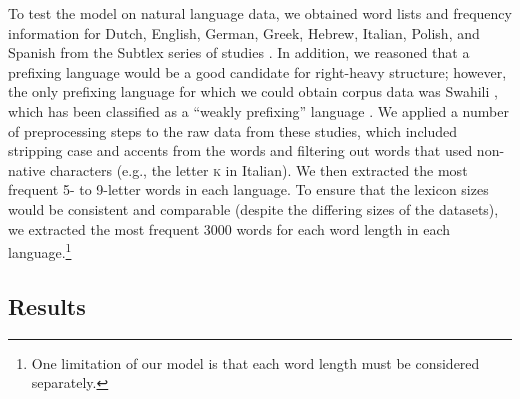 \documentclass[doc,biblatex,floatsintext]{apa7}
\begin{document}
To test the model on natural language data, we obtained word lists and frequency information for Dutch, English, German, Greek, Hebrew, Italian, Polish, and Spanish from the Subtlex series of studies \parencite{Brysbaert:2009, Brysbaert:2011, Crepaldi:2015, Cuetos:2011, Dimitropoulou:2010, Keuleers:2010, Mandera:2014, VanParidon:2021}. In addition, we reasoned that a prefixing language would be a good candidate for right-heavy structure; however, the only prefixing language for which we could obtain corpus data was Swahili \parencite{Hurskainen:2016}, which has been classified as a ``weakly prefixing'' language \parencite{wals-26}. We applied a number of preprocessing steps to the raw data from these studies, which included stripping case and accents from the words and filtering out words that used non-native characters (e.g., the letter \textsc{k} in Italian). We then extracted the most frequent 5- to 9-letter words in each language. To ensure that the lexicon sizes would be consistent and comparable (despite the differing sizes of the datasets), we extracted the most frequent 3000 words for each word length in each language.\footnote{One limitation of our model is that each word length must be considered separately.}

\subsection{Results}
\end{document}
